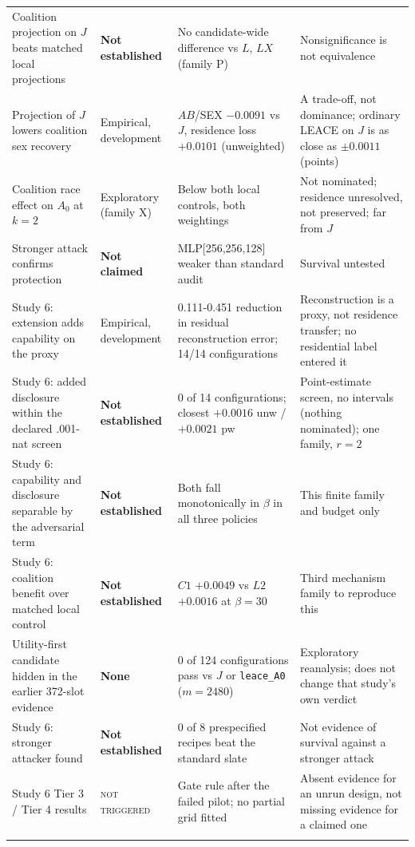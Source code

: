\begin{tabular}{@{}p{4.0cm}p{2.5cm}p{3.7cm}p{4.9cm}@{}}
\addlinespace[1.5pt]
Coalition projection on $J$ beats matched local projections & \textbf{Not established} & No candidate-wide difference vs $L$, $LX$ (family P) & Nonsignificance is not equivalence \\
\addlinespace[1.5pt]
Projection of $J$ lowers coalition sex recovery & Empirical, development & $AB$/SEX $-0.0091$ vs $J$, residence loss $+0.0101$ (unweighted) & A trade-off, not dominance; ordinary LEACE on $J$ is as close as $\pm0.0011$ (points) \\
\addlinespace[1.5pt]
Coalition race effect on $A_0$ at $k{=}2$ & Exploratory (family X) & Below both local controls, both weightings & Not nominated; residence unresolved, not preserved; far from $J$ \\
\addlinespace[1.5pt]
Stronger attack confirms protection & \textbf{Not claimed} & MLP[256,256,128] weaker than standard audit & Survival untested \\
\addlinespace[1.5pt]
Study 6: extension adds capability on the proxy & Empirical, development & 0.111-0.451 reduction in residual reconstruction error; 14/14 configurations & Reconstruction is a proxy, not residence transfer; no residential label entered it \\
\addlinespace[1.5pt]
Study 6: added disclosure within the declared .001-nat screen & \textbf{Not established} & 0 of 14 configurations; closest $+0.0016$ unw / $+0.0021$ pw & Point-estimate screen, no intervals (nothing nominated); one family, $r{=}2$ \\
\addlinespace[1.5pt]
Study 6: capability and disclosure separable by the adversarial term & \textbf{Not established} & Both fall monotonically in $\beta$ in all three policies & This finite family and budget only \\
\addlinespace[1.5pt]
Study 6: coalition benefit over matched local control & \textbf{Not established} & $C1$ $+0.0049$ vs $L2$ $+0.0016$ at $\beta{=}30$ & Third mechanism family to reproduce this \\
\addlinespace[1.5pt]
Utility-first candidate hidden in the earlier 372-slot evidence & \textbf{None} & 0 of 124 configurations pass vs $J$ or \texttt{leace\_A0} ($m{=}2480$) & Exploratory reanalysis; does not change that study's own verdict \\
\addlinespace[1.5pt]
Study 6: stronger attacker found & \textbf{Not established} & 0 of 8 prespecified recipes beat the standard slate & Not evidence of survival against a stronger attack \\
\addlinespace[1.5pt]
Study 6 Tier 3 / Tier 4 results & \textsc{not triggered} & Gate rule after the failed pilot; no partial grid fitted & Absent evidence for an unrun design, not missing evidence for a claimed one \\
\addlinespace[1.5pt]
\bottomrule
\end{tabular}

